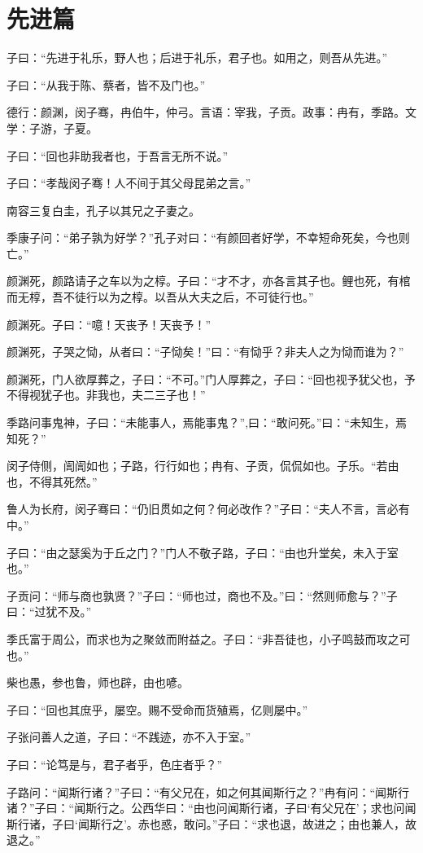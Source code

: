 \documentclass[12pt,a4paper]{ctexbook}
\begin{document}
\section{先进篇}
子曰：“先进于礼乐，野人也；后进于礼乐，君子也。如用之，则吾从先进。”\par
子曰：“从我于陈、蔡者，皆不及门也。”\par
德行：颜渊，闵子骞，冉伯牛，仲弓。言语：宰我，子贡。政事：冉有，季路。文学：子游，子夏。\par
子曰：“回也非助我者也，于吾言无所不说。”\par
子曰：“孝哉闵子骞！人不间于其父母昆弟之言。”\par
南容三复白圭，孔子以其兄之子妻之。\par
季康子问：“弟子孰为好学？”孔子对曰：“有颜回者好学，不幸短命死矣，今也则亡。”\par
颜渊死，颜路请子之车以为之椁。子曰：“才不才，亦各言其子也。鲤也死，有棺而无椁，吾不徒行以为之椁。以吾从大夫之后，不可徒行也。”\par
颜渊死。子曰：“噫！天丧予！天丧予！”\par
颜渊死，子哭之恸，从者曰：“子恸矣！”曰：“有恸乎？非夫人之为恸而谁为？”\par
颜渊死，门人欲厚葬之，子曰：“不可。”门人厚葬之，子曰：“回也视予犹父也，予不得视犹子也。非我也，夫二三子也！”\par
季路问事鬼神，子曰：“未能事人，焉能事鬼？”,曰：“敢问死。”曰：“未知生，焉知死？”\par
闵子侍侧，訚訚如也；子路，行行如也；冉有、子贡，侃侃如也。子乐。“若由也，不得其死然。”\par
鲁人为长府，闵子骞曰：“仍旧贯如之何？何必改作？”子曰：“夫人不言，言必有中。”\par
子曰：“由之瑟奚为于丘之门？”门人不敬子路，子曰：“由也升堂矣，未入于室也。”\par
子贡问：“师与商也孰贤？”子曰：“师也过，商也不及。”曰：“然则师愈与？”子曰：“过犹不及。”\par
季氏富于周公，而求也为之聚敛而附益之。子曰：“非吾徒也，小子鸣鼓而攻之可也。”\par
柴也愚，参也鲁，师也辟，由也喭。\par
子曰：“回也其庶乎，屡空。赐不受命而货殖焉，亿则屡中。”\par
子张问善人之道，子曰：“不践迹，亦不入于室。”\par
子曰：“论笃是与，君子者乎，色庄者乎？”\par
子路问：“闻斯行诸？”子曰：“有父兄在，如之何其闻斯行之？”冉有问：“闻斯行诸？”子曰：“闻斯行之。公西华曰：“由也问闻斯行诸，子曰‘有父兄在’；求也问闻斯行诸，子曰‘闻斯行之’。赤也惑，敢问。”子曰：“求也退，故进之；由也兼人，故退之。”\par
\end{document}
